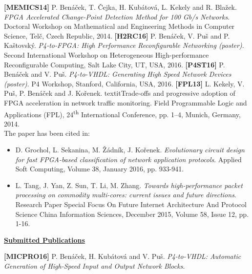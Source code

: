 \begin{frame}[allowframebreaks]
{\begin{itemize}
\begin{itemize}
        \end{itemize}
        \fitem[$\rightarrow$] \textbf{[MEMICS14]} P. Ben\'{a}\v{c}ek, T. \v{C}ejka, H. Kub\'{a}tov\'{a}, L. Kekely and R. Bla\v{z}ek.
        \textit{FPGA Accelerated Change-Point Detection Method for 100 Gb/s Networks}.
        Doctoral Workshop on Mathematical and Engineering Methods in Computer Science, Tel\v{c}, Czech Republic,
        2014.
        \fitem[$\rightarrow$] \textbf{[H2RC16]} P. Ben\'{a}\v{c}ek, V. Pu\v{s} and P. Ka\v{s}tovsk\'y.
        \textit{P4-to-FPGA: High Performance Reconfigurable Networking (poster)}.
        Second International Workshop on Heterogeneous High-performance Reconfigurable Computing, Salt Lake City, UT, USA,
        2016.
        \fitem[$\rightarrow$] \textbf{[P4ST16]} P. Ben{\'a}{\v{c}}ek and V. Pu{\v{s}}.
        \textit{P4-to-VHDL: Generating High Speed Network Devices (poster)}. 
        P4 Workshop, Stanford, California, USA, 
        2016.
        \fitem[$\rightarrow$] \textbf{[FPL13]} L. Kekely, V. Pu\v{s}, P. Ben{\'a}\v{c}ek and J. Ko\v{r}enek.
        textit{Trade-offs and progressive adoption of FPGA acceleration in network traffic monitoring}.
        Field Programmable Logic and Applications (FPL), 24\textsuperscript{th} International Conference, pp. 1--4, Munich, Germany,
        2014.
        \smallskip \\ \smallskip The paper has been cited in:
        \begin{itemize}
            \footnotesize
            \item D. Grochol, L. Sekanina, M. \v{Z}\'{a}dn\'{i}k, J. Ko\v{r}enek. \textit{Evolutionary circuit design for fast FPGA-based classification of network application protocols}. 
            Applied Soft Computing, Volume 38, January 2016, pp. 933-941.
            \item L. Tang, J. Yan, Z. Sun, T. Li, M. Zhang. \textit{Towards high-performance packet processing on commodity multi-cores: current issues and future directions}.
            Research Paper Special Focus On Future Internet Architecture And Protocol Science China Information Sciences, December 2015, Volume 58, Issue 12, pp. 1-16.
        \end{itemize}
    \end{itemize}
    \textbf{\underline{Submitted Publications}}
    \begin{itemize}
        \fitem[$\rightarrow$] \textbf{[MICPRO16]} P. Ben\'{a}\v{c}ek, H. Kub\'{a}tov\'{a} and V. Pu\v{s}.
        \textit{P4-to-VHDL: Automatic Generation of High-Speed Input and Output Network Blocks}.

\end{itemize}}
\end{frame}
